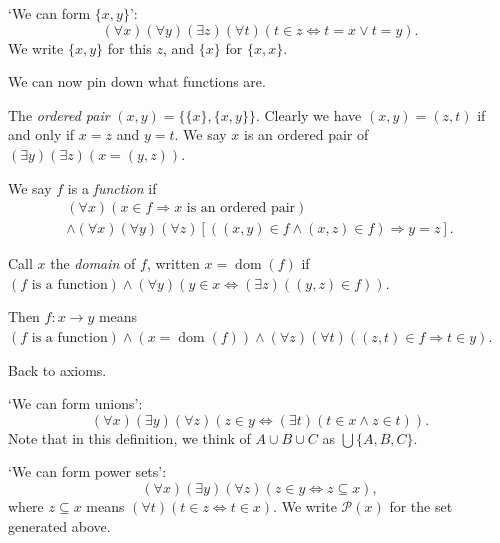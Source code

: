\documentclass[a3paper, 10pt]{article}
\renewcommand{\vocab}[1]{\emph{#1}}
\begin{document}
\begin{multicols*}{5}
\begin{axiom}
  `We can form $\{x, y\}$':
  $$
(\forall x)(\forall y)(\exists z)(\forall t)(t \in z \Leftrightarrow t = x \lor t = y).
  $$
  We write $\{x, y\}$ for this $z$, and $\{x\}$ for $\{x, x\}$.
\end{axiom}

We can now pin down what functions are.

\begin{definition}
  The \vocab{ordered pair} $(x, y) = \{\{x\}, \{x, y\}\}$. Clearly we have $(x, y) = (z, t)$ if and only if $x = z$ and $y = t$.
  We say $x$ is an ordered pair of $(\exists y)(\exists z)(x = (y, z))$.
\end{definition}
\begin{definition}[Function]
  We say $f$ is a \vocab{function} if
  \begin{align*}
  (\forall x)(x \in f \Rightarrow x\text{ is an ordered pair})\\
  \land (\forall x)(\forall y)(\forall z) [((x, y) \in f\land (x, z) \in f) \Rightarrow y = z].
  \end{align*}
\end{definition}
\begin{definition}[Domain]
  Call $x$ the \vocab{domain} of $f$, written $x = \operatorname{dom}(f)$ if $(f \text{ is a function})\land (\forall y)(y \in x \Leftrightarrow (\exists z)((y, z) \in f))$. 
  
  Then $f: x \rightarrow y$ means $(f\text{ is a function}) \land (x = \operatorname{dom}(f)) \land (\forall z)(\forall t)((z, t) \in f \Rightarrow t \in y)$.
\end{definition}


Back to axioms.

\begin{axiom}
  `We can form unions':
  $$
(\forall x)(\exists y)(\forall z)(z \in y \Leftrightarrow (\exists t)(t \in x \land z \in t)).
  $$
  Note that in this definition, we think of $A \cup B \cup C$ as $\bigcup \{A, B, C\}$.
\end{axiom}

\begin{axiom}
  `We can form power sets':
  $$
  (\forall x)(\exists y)(\forall z)(z \in y \Leftrightarrow z \subseteq x),
  $$
  where $z \subseteq x$ means $(\forall t)(t \in z \Leftrightarrow t \in x)$. We write $\mathcal{P}(x)$ for the set generated above.
\end{axiom}


\end{multicols*}
\end{document}
